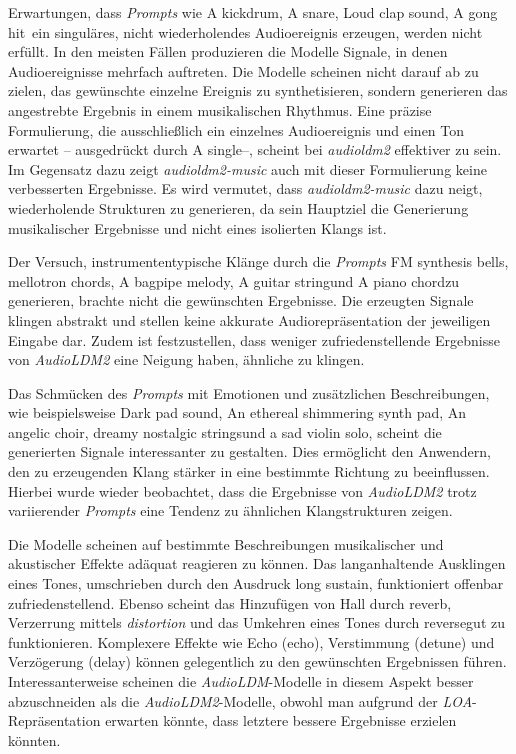 \documentclass[
  a4paper,  %
  twoside,  %
  bibliography=totoc,
  headsepline,
  cleardoublepage=empty,
  parskip=half,
  draft=false
]{scrbook}
\begin{document}
Erwartungen, dass \emph{Prompts} wie \glqq A kickdrum\grqq, \glqq A snare\grqq, \glqq Loud clap sound\grqq, \glqq A gong hit\grqq \, ein singuläres, nicht wiederholendes Audioereignis erzeugen, werden nicht erfüllt. In den meisten Fällen produzieren die Modelle Signale, in denen Audioereignisse mehrfach auftreten. Die Modelle scheinen nicht darauf ab zu zielen, das gewünschte einzelne Ereignis zu synthetisieren, sondern generieren das angestrebte Ergebnis in einem musikalischen Rhythmus. Eine präzise Formulierung, die ausschließlich ein einzelnes Audioereignis und einen Ton erwartet – ausgedrückt durch \glqq A single\grqq –, scheint bei \emph{audioldm2} \cite{noauthor_cvsspaudioldm2_nodate} effektiver zu sein. Im Gegensatz dazu zeigt \emph{audioldm2-music} \cite{noauthor_cvsspaudioldm2-music_nodate} auch mit dieser Formulierung keine verbesserten Ergebnisse. Es wird vermutet, dass \emph{audioldm2-music} \cite{noauthor_cvsspaudioldm2-music_nodate} dazu neigt, wiederholende Strukturen zu generieren, da sein Hauptziel die Generierung musikalischer Ergebnisse und nicht eines isolierten Klangs ist.

Der Versuch, instrumententypische Klänge durch die \emph{Prompts} \glqq FM synthesis bells\grqq, \glqq mellotron chords\grqq, \glqq A bagpipe melody\grqq, \glqq A guitar string\grqq und \glqq A piano chord\grqq zu generieren, brachte nicht die gewünschten Ergebnisse. Die erzeugten Signale klingen abstrakt und stellen keine akkurate Audiorepräsentation der jeweiligen Eingabe dar. Zudem ist festzustellen, dass weniger zufriedenstellende Ergebnisse von \emph{AudioLDM2} eine Neigung haben, ähnliche zu klingen.

Das Schmücken des \emph{Prompts} mit Emotionen und zusätzlichen Beschreibungen, wie beispielsweise \glqq Dark pad sound\grqq, \glqq An ethereal shimmering synth pad\grqq, \glqq An angelic choir\grqq, \glqq dreamy nostalgic strings\grqq und \glqq a sad violin solo\grqq, scheint die generierten Signale interessanter zu gestalten. Dies ermöglicht den Anwendern, den zu erzeugenden Klang stärker in eine bestimmte Richtung zu beeinflussen. Hierbei wurde wieder beobachtet, dass die Ergebnisse von \emph{AudioLDM2} trotz variierender \emph{Prompts} eine Tendenz zu ähnlichen Klangstrukturen zeigen.

Die Modelle scheinen auf bestimmte Beschreibungen musikalischer und akustischer Effekte adäquat reagieren zu können. Das langanhaltende Ausklingen eines Tones, umschrieben durch den Ausdruck \glqq long sustain\grqq, funktioniert offenbar zufriedenstellend. Ebenso scheint das Hinzufügen von Hall durch \glqq reverb\grqq, Verzerrung mittels \emph{distortion} und das Umkehren eines Tones durch \glqq reverse\grqq gut zu funktionieren. Komplexere Effekte wie Echo (\glqq echo\grqq), Verstimmung (\glqq detune\grqq) und Verzögerung (\glqq delay\grqq) können gelegentlich zu den gewünschten Ergebnissen führen. Interessanterweise scheinen die \emph{AudioLDM}-Modelle in diesem Aspekt besser abzuschneiden als die \emph{AudioLDM2}-Modelle, obwohl man aufgrund der \emph{LOA}-Repräsentation erwarten könnte, dass letztere bessere Ergebnisse erzielen könnten.
\end{document}
